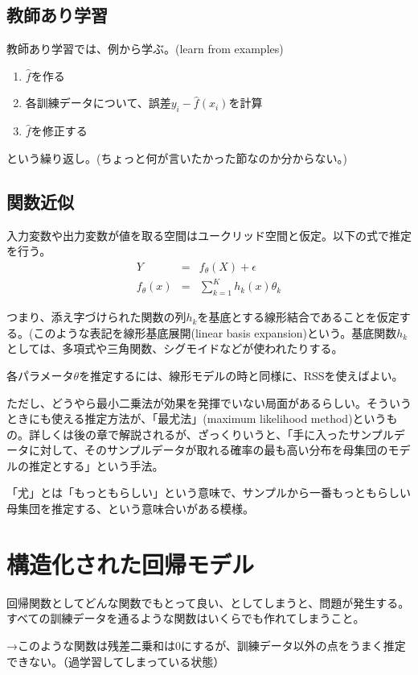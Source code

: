 \documentclass{jsarticle}
\begin{document}
\subsection{教師あり学習}
教師あり学習では、例から学ぶ。(learn from examples)
\begin{enumerate}
  \item $\hat{f}$を作る
  \item 各訓練データについて、誤差$y_i - \hat{f}(x_i)$を計算
  \item $\hat{f}$を修正する
\end{enumerate}

という繰り返し。(ちょっと何が言いたかった節なのか分からない。)

\subsection{関数近似}
入力変数や出力変数が値を取る空間はユークリッド空間と仮定。以下の式で推定を行う。
\begin{eqnarray*}
  Y&=&f_\theta(X) + \epsilon \\
  f_\theta(x) &=& \sum_{k=1}^Kh_k(x)\theta_k
\end{eqnarray*}

つまり、添え字づけられた関数の列$h_k$を基底とする線形結合であることを仮定する。(このような表記を線形基底展開(linear basis expansion)という。基底関数$h_k$としては、多項式や三角関数、シグモイドなどが使われたりする。

各パラメータ$\theta$を推定するには、線形モデルの時と同様に、RSSを使えばよい。

ただし、どうやら最小二乗法が効果を発揮でいない局面があるらしい。そういうときにも使える推定方法が、「最尤法」(maximum likelihood method)というもの。詳しくは後の章で解説されるが、ざっくりいうと、「手に入ったサンプルデータに対して、そのサンプルデータが取れる確率の最も高い分布を母集団のモデルの推定とする」という手法。

「尤」とは「もっともらしい」という意味で、サンプルから一番もっともらしい母集団を推定する、という意味合いがある模様。

\section{構造化された回帰モデル}
回帰関数としてどんな関数でもとって良い、としてしまうと、問題が発生する。すべての訓練データを通るような関数はいくらでも作れてしまうこと。

→このような関数は残差二乗和は0にするが、訓練データ以外の点をうまく推定できない。（過学習してしまっている状態）
\end{document}
